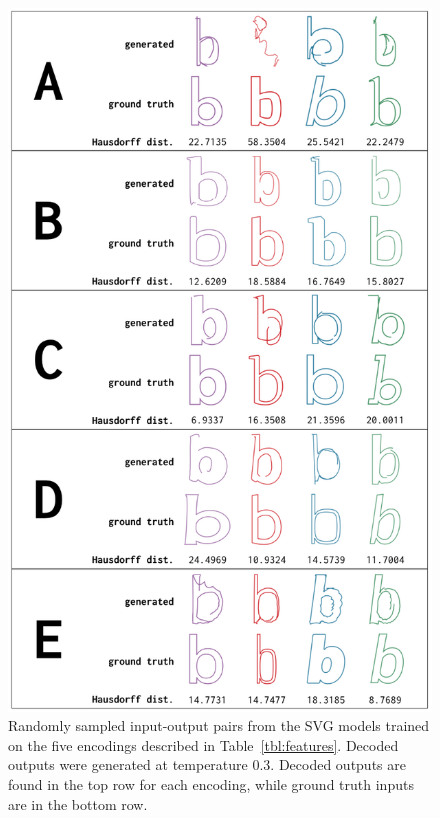 \begin{figure}[t]
    \centering
	\includegraphics[height=0.8\textheight]{figures/encodings}
    \caption[Visual results of training the SVG model with different encodings]
    {Randomly sampled input-output pairs from the SVG models trained on the five encodings described in Table~\ref{tbl:features}.
    Decoded outputs were generated at temperature 0.3.
    Decoded outputs are found in the top row for each encoding, while ground truth inputs are in the bottom row.\label{fig:encodings}}
\end{figure}

